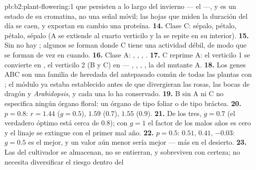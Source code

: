 \begin{solution}{pb:b2:plant-flowering:1}
que persisten a lo largo del invierno --- el  ---, y es un estado
de su cromatina, no una señal móvil; las hojas que miden la duración del
día se caen, y exportan en cambio una proteína.
\textbf{14.} Clase C: sépalo, pétalo, pétalo, sépalo (A se extiende al cuarto
verticilo y la  se repite en su interior).
\textbf{15.} Sin  no hay ; algunos  se forman donde C
tiene una actividad débil, de modo que se forman  de vez en
cuando.
\textbf{16.} Clase A: , , , .
\textbf{17.} C reprime A: el verticilo 1 se convierte en , el
verticilo 2 (B y C) en  --- , , , ,
la  del mutante A.
\textbf{18.} Los genes ABC son una familia de 
heredada del antepasado común de todas las plantas con ; el módulo
ya estaba establecido antes de que divergieran las rosas, las bocas de
dragón y \emph{Arabidopsis}, y cada una lo ha conservado.
\textbf{19.} B sin A ni C no especifica ningún órgano floral: un órgano de
tipo foliar o de tipo bráctea.
\textbf{20.} $p = 0.8$: $r = 1.44$ ($g = 0.5$), $1.59$ ($0.7$), $1.55$
($0.9$).
\textbf{21.} De los tres, $g = 0.7$ (el verdadero óptimo está cerca de
$0.8$); con $g = 1$ el factor de los malos años es cero y el linaje se
extingue con el primer mal año.
\textbf{22.} $p = 0.5$: $0.51$, $0.41$, $-0.03$: $g = 0.5$ es el mejor, y
un valor aún menor sería mejor --- más  en el desierto.
\textbf{23.} Las  del cultivador se almacenan, no se entierran, y
sobreviven con certeza; no necesita diversificar el riesgo dentro del

\end{solution}
